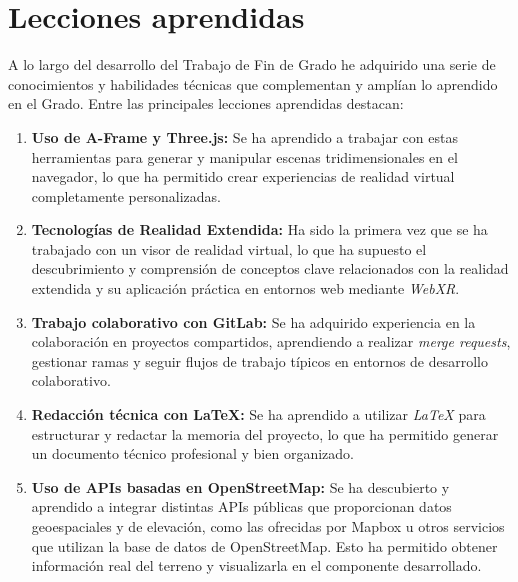 \documentclass[a4paper, 12pt]{book}
\begin{document}
\section{Lecciones aprendidas}
\label{sec:lecciones_aprendidas}



A lo largo del desarrollo del Trabajo de Fin de Grado he adquirido una serie de conocimientos y habilidades técnicas que complementan y amplían lo aprendido en el Grado. Entre las principales lecciones aprendidas destacan:

\begin{enumerate}
  \item \textbf{Uso de A-Frame y Three.js:} Se ha aprendido a trabajar con estas herramientas para generar y manipular escenas tridimensionales en el navegador, lo que ha permitido crear experiencias de realidad virtual completamente personalizadas.

  \item \textbf{Tecnologías de Realidad Extendida:} Ha sido la primera vez que se ha trabajado con un visor de realidad virtual, lo que ha supuesto el descubrimiento y comprensión de conceptos clave relacionados con la realidad extendida y su aplicación práctica en entornos web mediante \textit{WebXR}.

  \item \textbf{Trabajo colaborativo con GitLab:} Se ha adquirido experiencia en la colaboración en proyectos compartidos, aprendiendo a realizar \textit{merge requests}, gestionar ramas y seguir flujos de trabajo típicos en entornos de desarrollo colaborativo.

  \item \textbf{Redacción técnica con LaTeX:} Se ha aprendido a utilizar \textit{LaTeX} para estructurar y redactar la memoria del proyecto, lo que ha permitido generar un documento técnico profesional y bien organizado.

  \item \textbf{Uso de APIs basadas en OpenStreetMap:} Se ha descubierto y aprendido a integrar distintas APIs públicas que proporcionan datos geoespaciales y de elevación, como las ofrecidas por Mapbox u otros servicios que utilizan la base de datos de OpenStreetMap. Esto ha permitido obtener información real del terreno y visualizarla en el componente desarrollado.
\end{enumerate}
\end{document}
